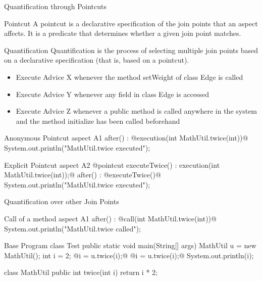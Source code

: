 \begin{frame}[fragile]{Quantification through Pointcuts}
	\begin{mycolumns}[animation=none]
		\begin{definition}{Pointcut }
			A pointcut is a declarative specification of the join points that an aspect affects. It is a predicate that determines whether a given join point matches.
		\end{definition}
		\begin{definition}{Quantification }
			Quantification  is the process of selecting multiple join points based on a declarative specification (that is, based on a pointcut).
		\end{definition}
		\begin{example}{}
			\small
			\begin{itemize}
				\item Execute Advice X whenever the method setWeight of class Edge is called
				\item Execute Advice Y whenever any field in class Edge is accessed
				\item Execute Advice Z whenever a public method is called anywhere in the system and the method initialize has been called beforehand
			\end{itemize}
		\end{example}
	\mynextcolumn
{\small
\begin{codetight}{Anonymous Pointcut}
aspect A1 {
	after() : @execution(int MathUtil.twice(int))@ {
		System.out.println("MathUtil.twice executed");
	}
}
\end{codetight}			
\begin{codetight}{Explicit Pointcut}
aspect A2 {
	@pointcut executeTwice() : 
			execution(int MathUtil.twice(int));@
	after() : @executeTwice()@ {
		System.out.println("MathUtil.twice executed");
	}
}
\end{codetight}	
}
	\end{mycolumns}
\end{frame}

\begin{frame}[fragile]{Quantification over other Join Points}
	\begin{mycolumns}[animation=none]
\begin{codetight}{Call of a method}
aspect A1 {
	after() : @call(int MathUtil.twice(int))@ {
		System.out.println("MathUtil.twice called");
	}
}
\end{codetight}
	\mynextcolumn
\begin{codetight}{Base Program}
class Test {
	public static void main(String[] args) {
		MathUtil u = new MathUtil();
		int i = 2;
		@i = u.twice(i);@
		@i = u.twice(i);@
		System.out.println(i);
	}
}

class MathUtil {
	public int twice(int i) {
		return i * 2;
	}
}
\end{codetight}	
	\end{mycolumns}
\end{frame}

